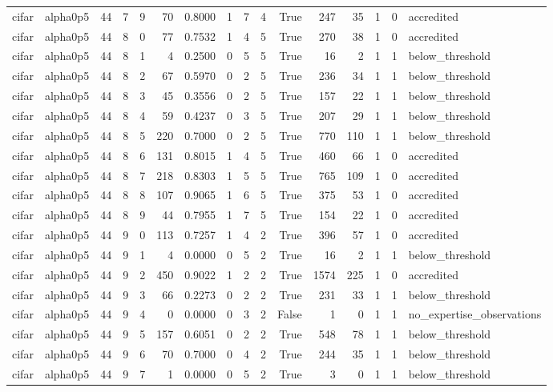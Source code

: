 \begin{tabular}{llrrrrrrrrrrrrrl}
cifar & alpha0p5 & 44 & 7 & 9 & 70 & 0.8000 & 1 & 7 & 4 & True & 247 & 35 & 1 & 0 & accredited \\
cifar & alpha0p5 & 44 & 8 & 0 & 77 & 0.7532 & 1 & 4 & 5 & True & 270 & 38 & 1 & 0 & accredited \\
cifar & alpha0p5 & 44 & 8 & 1 & 4 & 0.2500 & 0 & 5 & 5 & True & 16 & 2 & 1 & 1 & below\_threshold \\
cifar & alpha0p5 & 44 & 8 & 2 & 67 & 0.5970 & 0 & 2 & 5 & True & 236 & 34 & 1 & 1 & below\_threshold \\
cifar & alpha0p5 & 44 & 8 & 3 & 45 & 0.3556 & 0 & 2 & 5 & True & 157 & 22 & 1 & 1 & below\_threshold \\
cifar & alpha0p5 & 44 & 8 & 4 & 59 & 0.4237 & 0 & 3 & 5 & True & 207 & 29 & 1 & 1 & below\_threshold \\
cifar & alpha0p5 & 44 & 8 & 5 & 220 & 0.7000 & 0 & 2 & 5 & True & 770 & 110 & 1 & 1 & below\_threshold \\
cifar & alpha0p5 & 44 & 8 & 6 & 131 & 0.8015 & 1 & 4 & 5 & True & 460 & 66 & 1 & 0 & accredited \\
cifar & alpha0p5 & 44 & 8 & 7 & 218 & 0.8303 & 1 & 5 & 5 & True & 765 & 109 & 1 & 0 & accredited \\
cifar & alpha0p5 & 44 & 8 & 8 & 107 & 0.9065 & 1 & 6 & 5 & True & 375 & 53 & 1 & 0 & accredited \\
cifar & alpha0p5 & 44 & 8 & 9 & 44 & 0.7955 & 1 & 7 & 5 & True & 154 & 22 & 1 & 0 & accredited \\
cifar & alpha0p5 & 44 & 9 & 0 & 113 & 0.7257 & 1 & 4 & 2 & True & 396 & 57 & 1 & 0 & accredited \\
cifar & alpha0p5 & 44 & 9 & 1 & 4 & 0.0000 & 0 & 5 & 2 & True & 16 & 2 & 1 & 1 & below\_threshold \\
cifar & alpha0p5 & 44 & 9 & 2 & 450 & 0.9022 & 1 & 2 & 2 & True & 1574 & 225 & 1 & 0 & accredited \\
cifar & alpha0p5 & 44 & 9 & 3 & 66 & 0.2273 & 0 & 2 & 2 & True & 231 & 33 & 1 & 1 & below\_threshold \\
cifar & alpha0p5 & 44 & 9 & 4 & 0 & 0.0000 & 0 & 3 & 2 & False & 1 & 0 & 1 & 1 & no\_expertise\_observations \\
cifar & alpha0p5 & 44 & 9 & 5 & 157 & 0.6051 & 0 & 2 & 2 & True & 548 & 78 & 1 & 1 & below\_threshold \\
cifar & alpha0p5 & 44 & 9 & 6 & 70 & 0.7000 & 0 & 4 & 2 & True & 244 & 35 & 1 & 1 & below\_threshold \\
cifar & alpha0p5 & 44 & 9 & 7 & 1 & 0.0000 & 0 & 5 & 2 & True & 3 & 0 & 1 & 1 & below\_threshold \\

\end{tabular}
